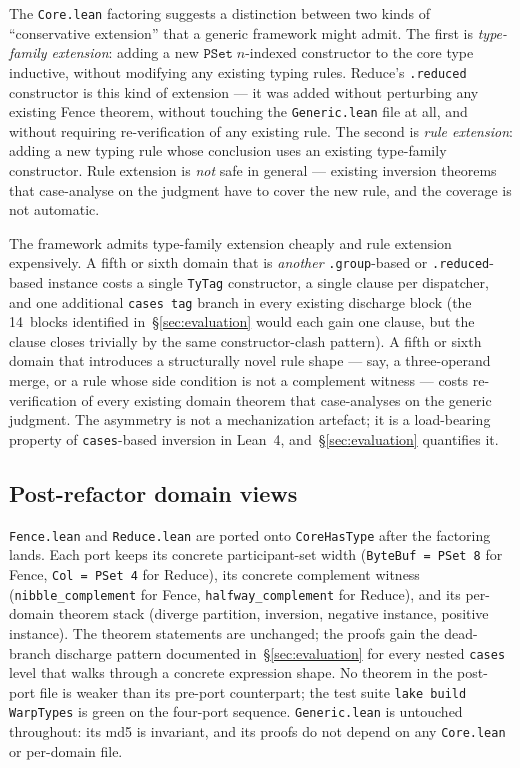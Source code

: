 \documentclass[acmsmall,screen,review,anonymous,nonacm]{acmart}
\newcommand{\PSet}{\texttt{PSet}}
\newcommand{\CoreHasType}{\texttt{CoreHasType}}
\newcommand{\TyTag}{\texttt{TyTag}}
\begin{document}
The \texttt{Core.lean} factoring suggests a distinction between two kinds of ``conservative extension'' that a generic framework might admit. The first is \emph{type-family extension}: adding a new $\PSet\;n$-indexed constructor to the core type inductive, without modifying any existing typing rules. Reduce's \texttt{.reduced} constructor is this kind of extension --- it was added without perturbing any existing Fence theorem, without touching the \texttt{Generic.lean} file at all, and without requiring re-verification of any existing rule. The second is \emph{rule extension}: adding a new typing rule whose conclusion uses an existing type-family constructor. Rule extension is \emph{not} safe in general --- existing inversion theorems that case-analyse on the judgment have to cover the new rule, and the coverage is not automatic.

The framework admits type-family extension cheaply and rule extension expensively. A fifth or sixth domain that is \emph{another} \texttt{.group}-based or \texttt{.reduced}-based instance costs a single \TyTag{} constructor, a single clause per dispatcher, and one additional \texttt{cases tag} branch in every existing discharge block (the 14~blocks identified in~\S\ref{sec:evaluation} would each gain one clause, but the clause closes trivially by the same constructor-clash pattern). A fifth or sixth domain that introduces a structurally novel rule shape --- say, a three-operand merge, or a rule whose side condition is not a complement witness --- costs re-verification of every existing domain theorem that case-analyses on the generic judgment. The asymmetry is not a mechanization artefact; it is a load-bearing property of \texttt{cases}-based inversion in Lean~4, and~\S\ref{sec:evaluation} quantifies it.

\subsection{Post-refactor domain views}\label{sec:post-refactor}

\texttt{Fence.lean} and \texttt{Reduce.lean} are ported onto \CoreHasType{} after the factoring lands. Each port keeps its concrete participant-set width (\texttt{ByteBuf = PSet 8} for Fence, \texttt{Col = PSet 4} for Reduce), its concrete complement witness (\texttt{nibble\_complement} for Fence, \texttt{halfway\_complement} for Reduce), and its per-domain theorem stack (diverge partition, inversion, negative instance, positive instance). The theorem statements are unchanged; the proofs gain the dead-branch discharge pattern documented in~\S\ref{sec:evaluation} for every nested \texttt{cases} level that walks through a concrete expression shape. No theorem in the post-port file is weaker than its pre-port counterpart; the test suite \texttt{lake build WarpTypes} is green on the four-port sequence. \texttt{Generic.lean} is untouched throughout: its md5 is invariant, and its proofs do not depend on any \texttt{Core.lean} or per-domain file.
\end{document}
